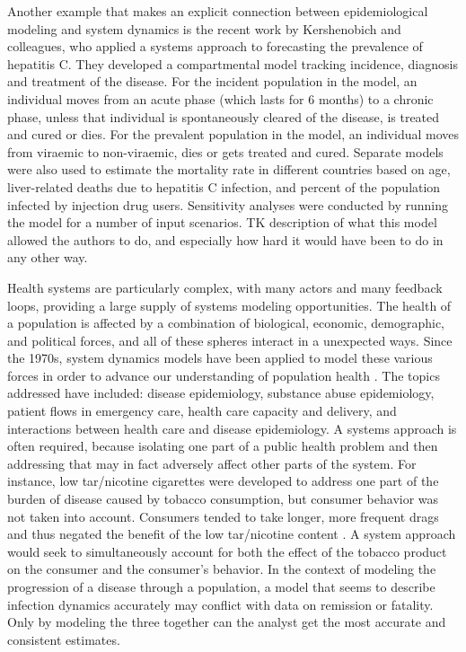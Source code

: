 Another example that makes an explicit connection between epidemiological modeling and system dynamics is the recent work by Kershenobich and colleagues, who applied a systems approach to forecasting the prevalence of hepatitis C. They developed a compartmental model tracking incidence, diagnosis and treatment of the disease. For the incident population in the model, an individual moves from an acute phase (which lasts for 6 months) to a chronic phase, unless that individual is spontaneously cleared of the disease, is treated and cured or dies. For the prevalent population in the model, an individual moves from viraemic to non-viraemic, dies or gets treated and cured. Separate models were also used to estimate the mortality rate in different countries based on age, liver-related deaths due to hepatitis C infection, and percent of the population infected by injection drug users. Sensitivity analyses were conducted by running the model for a number of input scenarios.  TK description of what this model allowed the authors to do, and especially how hard it would have been to do in any other way.

Health systems are particularly complex, with many actors and many feedback loops, providing a large supply of systems modeling opportunities. The health of a population is affected by a combination of biological, economic, demographic, and political forces, and all of these spheres interact in a unexpected ways. Since the 1970s, system dynamics models have been applied to model these various forces in order to advance our understanding of population health \cite{refs TK[KP6][ADF7]]}. The topics addressed have included: disease epidemiology, substance abuse epidemiology, patient flows in emergency care, health care capacity and delivery, and interactions between health care and disease epidemiology. A systems approach is often required, because isolating one part of a public health problem and then addressing that may in fact adversely affect other parts of the system. For instance, low tar/nicotine cigarettes were developed to address one part of the burden of disease caused by tobacco consumption, but consumer behavior was not taken into account. Consumers tended to take longer, more frequent drags and thus negated the benefit of the low tar/nicotine content \cite{Sterman_Learning_2006,[ref [KP8]TK]}. A system approach would seek to simultaneously account for both the effect of the tobacco product on the consumer and the consumer's behavior. In the context of modeling the progression of a disease through a population, a model that seems to describe infection dynamics accurately may conflict with data on remission or fatality. Only by modeling the three together can the analyst get the most accurate and consistent estimates.

